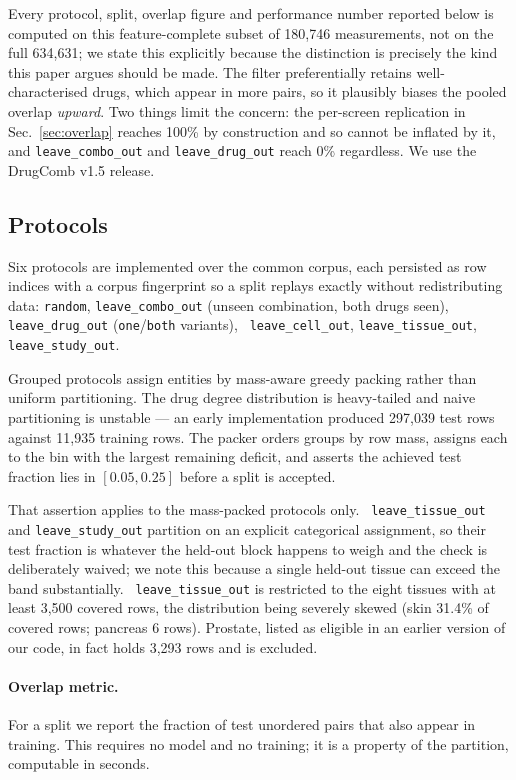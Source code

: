 \documentclass{ws-procs11x85}
\begin{document}
Every protocol, split, overlap figure and performance number reported below is
computed on this feature-complete subset of 180,746 measurements, not on the full
634,631; we state this explicitly because the distinction is precisely the kind
this paper argues should be made. The filter preferentially retains
well-characterised drugs, which appear in more pairs, so it plausibly biases the
pooled overlap \emph{upward}. Two things limit the concern: the per-screen
replication in Sec.~\ref{sec:overlap} reaches 100\% by construction and so cannot
be inflated by it, and {\tt leave\_combo\_out} and {\tt leave\_drug\_out} reach
0\% regardless. We use the DrugComb v1.5 release\cite{zheng2021}.

\subsection{Protocols}

Six protocols are implemented over the common corpus, each persisted as row
indices with a corpus fingerprint so a split replays exactly without
redistributing data: {\tt random}, {\tt leave\_combo\_out} (unseen combination,
both drugs seen), {\tt leave\_drug\_out} ({\tt one}/{\tt both} variants), {\tt
leave\_cell\_out}, {\tt leave\_tissue\_out}, {\tt leave\_study\_out}.

Grouped protocols assign entities by mass-aware greedy packing rather than
uniform partitioning. The drug degree distribution is heavy-tailed and naive
partitioning is unstable --- an early implementation produced 297,039 test rows
against 11,935 training rows. The packer orders groups by row mass, assigns each
to the bin with the largest remaining deficit, and asserts the achieved test
fraction lies in $[0.05, 0.25]$ before a split is accepted.

That assertion applies to the mass-packed protocols only. {\tt
leave\_tissue\_out} and {\tt leave\_study\_out} partition on an explicit
categorical assignment, so their test fraction is whatever the held-out block
happens to weigh and the check is deliberately waived; we note this because a
single held-out tissue can exceed the band substantially. {\tt
leave\_tissue\_out} is restricted to the eight tissues with at least 3,500
covered rows, the distribution being severely skewed (skin 31.4\% of covered
rows; pancreas 6 rows). Prostate, listed as eligible in an earlier version of our
code, in fact holds 3,293 rows and is excluded.

\paragraph{Overlap metric.} For a split we report the fraction of test unordered
pairs that also appear in training. This requires no model and no training; it is
a property of the partition, computable in seconds.
\end{document}
